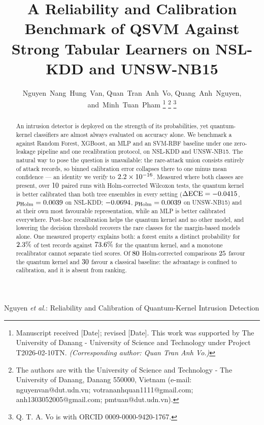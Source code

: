 \documentclass[journal]{IEEEtran}
\begin{document}
\let\flushbottom\raggedbottom
\raggedbottom

\title{A Reliability and Calibration Benchmark of QSVM Against Strong
  Tabular Learners on NSL-KDD and UNSW-NB15}

\author{Nguyen~Nang~Hung~Van,
        Quan~Tran~Anh~Vo,
        Quang~Anh~Nguyen,
        and~Minh~Tuan~Pham
\thanks{Manuscript received [Date]; revised [Date]. This work was
  supported by The University of Danang - University of Science and
  Technology under Project T2026-02-10TN. \textit{(Corresponding author: Quan Tran Anh Vo.)}}
\thanks{The authors are with the University of Science and Technology -
  The University of Danang, Danang 550000, Vietnam (e-mail:
  nguyenvan@dut.udn.vn; votrananhquan1111@gmail.com;
  anh1303052005@gmail.com; pmtuan@dut.udn.vn).}
\thanks{Q. T. A. Vo is with ORCID 0009-0000-9420-1767.}}

%
{Nguyen \MakeLowercase{\textit{et al.}}: Reliability and Calibration of Quantum-Kernel Intrusion Detection}

\maketitle

\begin{abstract}
An intrusion detector is deployed on the strength of its probabilities, yet
quantum-kernel classifiers are almost always evaluated on accuracy alone. We
benchmark a \QSVM{} against Random Forest, XGBoost, an MLP and an SVM-RBF
baseline under one zero-leakage pipeline and one recalibration protocol, on
NSL-KDD and UNSW-NB15. The natural way to pose the question is unavailable:
the rare-attack union consists entirely of attack records, so binned
calibration error collapses there to one minus mean confidence --- an
identity we verify to $2.2\times10^{-16}$. Measured where both classes are
present, over $10$ paired runs with Holm-corrected Wilcoxon tests, the
quantum kernel is better calibrated than both tree ensembles in every
setting ($\Delta\mathrm{ECE}=-0.0415$, $p_{\text{Holm}}=0.0039$ on NSL-KDD;
$-0.0694$, $p_{\text{Holm}}=0.0039$ on UNSW-NB15) and at
their own most favourable representation, while an MLP is better calibrated
everywhere. Post-hoc recalibration helps the quantum kernel and no other
model, and lowering the decision threshold recovers the rare classes for
the margin-based models alone. One measured property explains both: a
forest emits a distinct probability for $2.3\%$ of test records
against $73.6\%$ for the quantum kernel, and a monotone
recalibrator cannot separate tied scores. Of $80$ Holm-corrected
comparisons $25$ favour the quantum kernel and $30$ favour a
classical baseline: the advantage is confined to calibration, and it is
absent from ranking.
\end{abstract}
\end{document}
